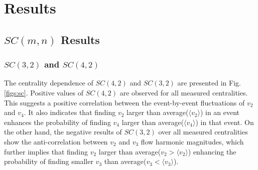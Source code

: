 \chapter{Results}

\section{$SC(m,n)$ Results}


\subsection{$SC(3,2)$ and $SC(4,2)$}

The centrality dependence of $SC(4,2)$ and $SC(3,2)$ are presented in Fig.\ref{figs:sc}. Positive values of $SC(4,2)$ are observed for all measured centralities. This suggests a positive correlation between the event-by-event fluctuations of $v_2$ and $v_4$. It also indicates that finding $v_2$ larger than average($\langle v_2 \rangle$) in an event enhances the probability of finding $v_4$ larger than average($\langle v_4 \rangle$) in that event. On the other hand, the negative results of $SC(3,2)$ over all measured centralities show the anti-correlation between $v_2$ and $v_3$ flow harmonic magnitudes, which further implies that finding $v_2$ larger than average($v_2 > \langle v_2 \rangle$) enhancing the probability of finding smaller $v_3$ than average($v_3 < \langle v_3 \rangle$).


